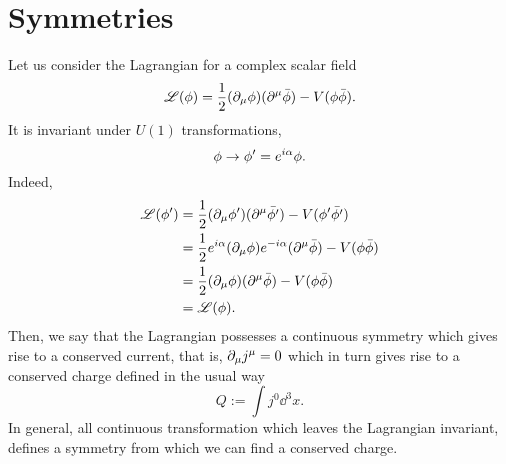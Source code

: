\section{Symmetries}
Let us consider the Lagrangian for a complex scalar field
\begin{equation}
  \mathscr{L}(\phi )=\frac{1}{2}(\partial_\mu \phi )(\partial^\mu \bar{\phi })-V(\phi\bar{\phi }).
\end{equation}
It is invariant under $U(1)$ transformations, 
\begin{equation}
  \phi\to \phi' =e^{i\alpha }\phi .
\end{equation}
Indeed,
\begin{align}
  \mathscr{L}(\phi ')&=\frac{1}{2}(\partial_\mu \phi' )(\partial^\mu \bar{\phi' })-V(\phi'\bar{\phi' })\\
  &=\frac{1}{2}e^{i\alpha }(\partial_\mu \phi )e^{-i\alpha }(\partial^\mu \bar{\phi })-V(\phi\bar{\phi })\\
  &=\frac{1}{2}(\partial_\mu \phi )(\partial^\mu \bar{\phi })-V(\phi\bar{\phi })\\
  &=\mathscr{L} (\phi ).
\end{align}
Then, we say that the Lagrangian possesses a continuous symmetry which gives rise to a conserved current, that is, $\partial_\mu j^\mu =0$ which in turn gives rise to a conserved charge defined in the usual way
\begin{equation}
  Q:=\int j^0 \dd^3x.
\end{equation}
In general, all continuous transformation which leaves the Lagrangian invariant, defines a symmetry from which we can find a conserved charge.




